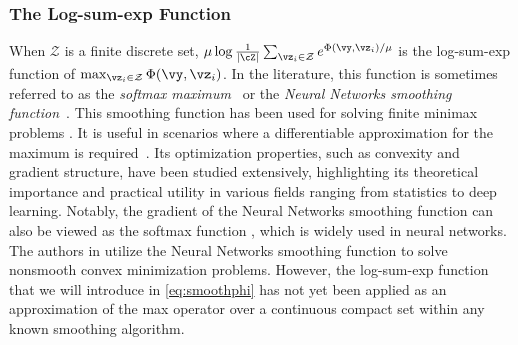 		
		
		\subsubsection{The Log-sum-exp Function}
		When $\mathcal{Z}$ is a finite discrete set, $\mu \log \frac{1}{|\cZ|}\sum_{\vz_i\in\mathcal{Z}} e^{\Phi(\vy,\vz_i)/\mu}$ is the log-sum-exp function of  $\max_{\vz_i\in\mathcal{Z}} \Phi(\vy,\vz_i)$. In the literature, this function is sometimes referred to as the \emph{softmax maximum}~\cite{lecun2015deep} or the \emph{Neural Networks smoothing  function}~\cite{chen2012smoothing, burke2013gradient}. This smoothing function has been used for solving finite minimax problems \cite{polak2003algorithms, pee2011solving}. It is useful in scenarios where a differentiable approximation for the maximum is required~\cite{burke2020subdifferential,boyd2004convex,blanchet2020semi,wang2023stochastic}.
		Its optimization properties, such as convexity and gradient structure, have been studied extensively, highlighting its theoretical importance and practical utility in various fields ranging from statistics to deep learning. Notably, the gradient of the Neural Networks smoothing  function can also be viewed as the softmax function \cite{lecun2015deep}, which is widely used in neural networks.
		The authors in \cite{wang2023stochastic} utilize the Neural Networks smoothing function to solve nonsmooth convex minimization problems.  
		However, 	the log-sum-exp function that we will introduce in \eqref{eq:smoothphi} has not yet been applied as an approximation of the max operator over a continuous compact set within any known smoothing algorithm. %